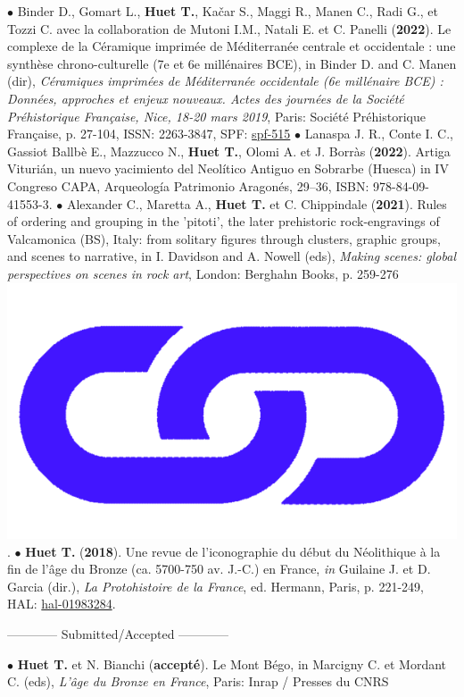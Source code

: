\documentclass{article}
\newcommand{\fr}[1]{}       %
\newcommand{\en}[1]{#1}     %
\begin{document}
$\bullet$ Binder D., Gomart L., \textbf{Huet T.}, Ka{\v{c}}ar S., Maggi R., Manen C., Radi G., et Tozzi C. avec la collaboration de Mutoni I.M., Natali E. et C. Panelli (\textbf{2022}). Le complexe de la C\'{e}ramique imprim\'{e}e de M\'{e}diterran\'{e}e centrale et occidentale : une synthèse chrono-culturelle (7e et 6e millénaires BCE), in Binder D. and C. Manen (dir), \textit{C\'{e}ramiques imprim\'{e}es de M\'{e}diterran\'{e}e occidentale (6e mill\'{e}naire BCE) : Donn\'{e}es, approches et enjeux nouveaux. Actes des journ\'{e}es de la Soci\'{e}t\'{e} Pr\'{e}historique Fran\c{c}aise, Nice, 18-20 mars 2019}, Paris: Soci\'{e}t\'{e} Pr\'{e}historique Fran\c{c}aise, p. 27-104, ISSN: 2263-3847, SPF: \href{https://www.prehistoire.org/515_p_57657/accEs-libre-seance-18-ceramiques-imprimees-de-mediterranee-occidentale.html}{spf-515}
\smallbreak
$\bullet$ Lanaspa J. R., Conte I. C., Gassiot Ballbè E., Mazzucco N., \textbf{Huet T.}, Olomi A. et J. Borràs (\textbf{2022}). Artiga Viturián, un nuevo yacimiento del Neolítico Antiguo en Sobrarbe (Huesca) in IV Congreso CAPA, Arqueología Patrimonio Aragonés, 29–36, ISBN: 978-84-09-41553-3.
\smallbreak
$\bullet$ Alexander C., Maretta A., \textbf{Huet T.} et C. Chippindale (\textbf{2021}). Rules of ordering and grouping in the 'pitoti', the later prehistoric rock-engravings of Valcamonica (BS), Italy: from solitary figures through clusters, graphic groups, and scenes to narrative, in I. Davidson and A. Nowell (eds), \textit{Making scenes: global perspectives on scenes in rock art}, London: Berghahn Books, p. 259-276 \href{https://www.berghahnbooks.com/title/DavidsonMaking}{\includegraphics[scale=0.015]{link_darkblue.png}}.
\smallbreak
$\bullet$ \textbf{Huet T.} (\textbf{2018}). Une revue de l'iconographie du d\'{e}but du N\'{e}olithique \`{a} la fin de l'\^{a}ge du Bronze (ca. 5700-750 av. J.-C.) en France, \textit{in} Guilaine J. et D. Garcia (dir.), \textit{La Protohistoire de la France}, ed. Hermann, Paris, p. 221-249, HAL: \href{https://hal.archives-ouvertes.fr/hal-01983284}{hal-01983284}.
\smallbreak
\fr{\begin{center}------------ Soumis/Accepté ------------\end{center}}\en{{\begin{center}------------ Submitted/Accepted ------------\end{center}}}
\smallbreak
$\bullet$ \textbf{Huet T.} et N. Bianchi (\textbf{accepté}). Le Mont Bégo, in Marcigny C. et Mordant C. (eds), \textit{L'âge du Bronze en France}, Paris: Inrap / Presses du CNRS
\end{document}
